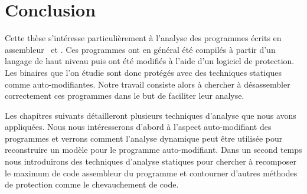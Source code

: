 \section{Conclusion}
Cette thèse s'intéresse particulièrement à l'analyse des programmes écrits en assembleur \xq\ et \xs. Ces programmes ont en général été compilés à partir d'un langage de haut niveau puis ont été modifiés à l'aide d'un logiciel de protection. Les binaires que l'on étudie sont donc protégés avec des techniques statiques comme auto-modifiantes. Notre travail consiste alors à chercher à désassembler correctement ces programmes dans le but de faciliter leur analyse.

Les chapitres suivants détailleront plusieurs techniques d'analyse que nous avons appliquées. Nous nous intéresserons d'abord à l'aspect auto-modifiant des programmes et verrons comment l'analyse dynamique peut être utilisée pour reconstruire un modèle pour le programme auto-modifiant. Dans un second temps nous introduirons des techniques d'analyse statiques pour chercher à recomposer le maximum de code assembleur du programme et contourner d'autres méthodes de protection comme le chevauchement de code.